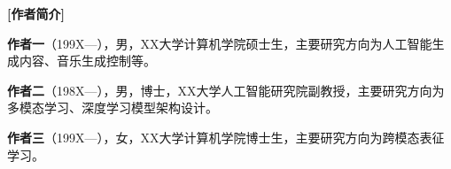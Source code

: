 \documentclass[twocolumn, a4paper, 10pt]{ctexart}
\begin{document}
\vspace{5mm}
\noindent \textbf{[作者简介]}

\vspace{3mm}
\noindent \textbf{作者一}（199X—），男，XX大学计算机学院硕士生，主要研究方向为人工智能生成内容、音乐生成控制等。

\vspace{2mm}
\noindent \textbf{作者二}（198X—），男，博士，XX大学人工智能研究院副教授，主要研究方向为多模态学习、深度学习模型架构设计。

\vspace{2mm}
\noindent \textbf{作者三}（199X—），女，XX大学计算机学院博士生，主要研究方向为跨模态表征学习。

\balance %
\end{document}
